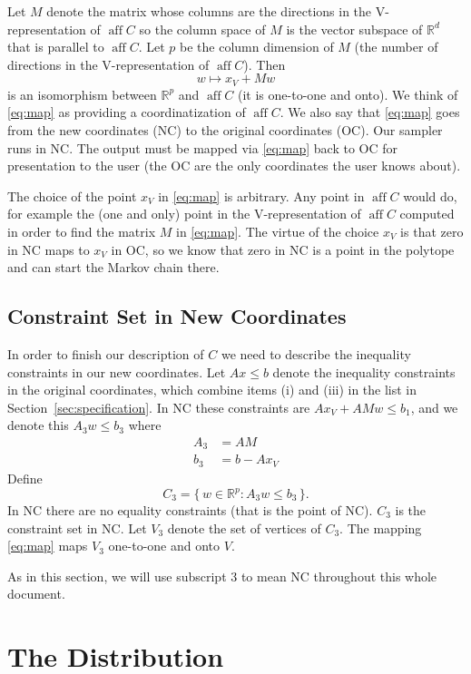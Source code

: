 \documentclass[11pt]{article}
\DeclareMathOperator{\aff}{aff}
\newcommand{\real}{\mathbb{R}}
\newcommand{\set}[1]{\{\, #1 \,\}}
\begin{document}
Let $M$ denote the matrix whose columns are the directions in the
V-representation of $\aff C$ so the column space of $M$ is the vector
subspace of $\real^d$ that is parallel to $\aff C$.  Let $p$ be the
column dimension of $M$ (the number of directions in the V-representation
of $\aff C$).  Then
\begin{equation} \label{eq:map}
   w \mapsto x_V + M w
\end{equation}
is an isomorphism between $\real^p$ and $\aff C$ (it is one-to-one and onto).
We think of \eqref{eq:map} as providing a coordinatization of $\aff C$.
We also say that \eqref{eq:map} goes from the new coordinates (NC) to
the original coordinates (OC).  Our sampler runs in NC.  The output
must be mapped via \eqref{eq:map} back to OC for presentation to the user
(the OC are the only coordinates the user knows about).

The choice of the point $x_V$ in \eqref{eq:map} is arbitrary.
Any point in $\aff C$ would do, for example the (one and only) point
in the V-representation of $\aff C$ computed in order to find the matrix
$M$ in \eqref{eq:map}.  The virtue of the choice $x_V$ is that zero in
NC maps to $x_V$ in OC, so we know that zero in NC is a point in the
polytope and can start the Markov chain there.

\subsection{Constraint Set in New Coordinates}

In order to finish our description of $C$ we need to describe the inequality
constraints in our new coordinates.  Let $A x \le b$ denote the inequality
constraints in the original coordinates, which combine items (i) and (iii)
in the list in Section~\ref{sec:specification}.
In NC these constraints are $A x_V + A M w \le b_1$,
and we denote this $A_3 w \le b_3$ where
\begin{align*}
   A_3 & = A M
   \\
   b_3 & = b - A x_V
\end{align*}
Define
$$
   C_3 = \set{ w \in \real^p : A_3 w \le b_3 }.
$$
In NC there are no equality constraints (that is the point of NC).
$C_3$ is the constraint set in NC.
Let $V_3$ denote the set of vertices of $C_3$.
The mapping \eqref{eq:map} maps $V_3$ one-to-one and onto $V$.

As in this section, we will use subscript 3 to mean NC throughout
this whole document.

\section{The Distribution}
\end{document}
